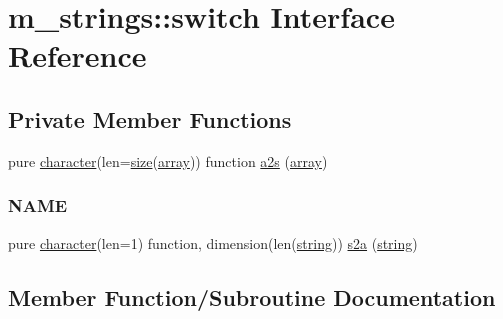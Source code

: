 \hypertarget{interfacem__strings_1_1switch}{}\section{m\+\_\+strings\+:\+:switch Interface Reference}
\label{interfacem__strings_1_1switch}
\subsection*{Private Member Functions}
\begin{DoxyCompactItemize}
\item 
pure \hyperlink{option__stopwatch_83_8txt_abd4b21fbbd175834027b5224bfe97e66}{character}(len=\hyperlink{what__overview_81_8txt_ab5692ed87074f1d5ec850a9ffa8b5af9}{size}(\hyperlink{intro__blas1_83_8txt_a89db1945e1a335ab0184c6a097821e32}{array})) function \hyperlink{interfacem__strings_1_1switch_a9e8d2a8effdbed2a822cfe14bbb9983c}{a2s} (\hyperlink{intro__blas1_83_8txt_a89db1945e1a335ab0184c6a097821e32}{array})
\begin{DoxyCompactList}\small\item\em \subsubsection*{N\+A\+ME}\end{DoxyCompactList}\item 
pure \hyperlink{option__stopwatch_83_8txt_abd4b21fbbd175834027b5224bfe97e66}{character}(len=1) function, dimension(len(\hyperlink{what__overview_81_8txt_a74cb7e955273b9f9157b4f0c18a38849}{string})) \hyperlink{interfacem__strings_1_1switch_a60d3e2ead0b3cfd08eaf61f93d3caf57}{s2a} (\hyperlink{what__overview_81_8txt_a74cb7e955273b9f9157b4f0c18a38849}{string})
\end{DoxyCompactItemize}


\subsection{Member Function/\+Subroutine Documentation}
\mbox{\label{interfacem__strings_1_1switch_a9e8d2a8effdbed2a822cfe14bbb9983c}} 
